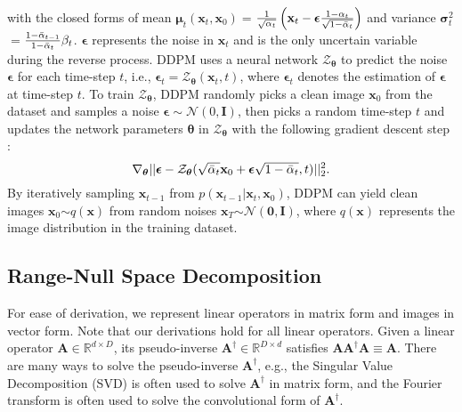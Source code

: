 \documentclass{article} \usepackage{iclr2023_conference,times}
\begin{document}
with the closed forms of mean $\boldsymbol{\mu}_{t}(\mathbf{x}_{t},\mathbf{x}_{0})$$=$$\frac{1}{\sqrt{\alpha_{t}}}	\left( \mathbf{x}_{t} - \boldsymbol{\epsilon}\frac{1-\alpha_{t}}{\sqrt{1-\Bar{\alpha}_{t}}} \right)$ and variance $\mathbf{\sigma}_{t}^{2}$$=$$\frac{1-\Bar{\alpha}_{t-1}}{1-\Bar{\alpha}_{t}}\beta_{t}$. $\boldsymbol{\epsilon}$ represents the noise in $\mathbf{x}_{t}$ and is the only uncertain variable during the reverse process. DDPM uses a neural network $\mathcal{Z}_{\boldsymbol{\theta}}$ to predict the noise $\boldsymbol{\epsilon}$ for each time-step $t$, i.e., $\boldsymbol{\epsilon}_t=\mathcal{Z}_{\boldsymbol{\theta}}(\mathbf{x}_{t},t)$, where $\boldsymbol{\epsilon}_t$ denotes the estimation of $\boldsymbol{\epsilon}$ at time-step $t$. To train  $\mathcal{Z}_{\boldsymbol{\theta}}$, DDPM randomly picks a clean image $\mathbf{x}_{0}$ from the dataset and samples a noise $\boldsymbol{\epsilon}\sim \mathcal{N}(0,\mathbf{I})$, then picks a random time-step $t$ and updates the network parameters $\boldsymbol{\theta}$ in $\mathcal{Z}_{\boldsymbol{\theta}}$ with the following gradient descent step \citep{ho2020denoising}:
\begin{equation}
    \nabla_{\boldsymbol{\theta}}||\boldsymbol{\epsilon}-\mathcal{Z}_{\boldsymbol{\theta}}(\sqrt{\Bar{\alpha}_{t}}\mathbf{x}_{0} + \boldsymbol{\epsilon}\sqrt{1-\Bar{\alpha}_{t}},t)||^{2}_{2}.
    \label{eq:7}
\end{equation}
By iteratively sampling $\mathbf{x}_{t-1}$ from $p(\mathbf{x}_{t-1}|\mathbf{x}_{t},\mathbf{x}_{0})$,  DDPM can yield clean images $\mathbf{x}_{0}$$\sim $$q(\mathbf{x})$ from random noises $\mathbf{x}_{T}$$\sim$$\mathcal{N}(\mathbf{0},\mathbf{I})$, where $q(\mathbf{x})$ represents the image distribution in the training dataset.


\subsection{Range-Null Space Decomposition}
\label{RND}
For ease of derivation, we represent linear operators in matrix form and images in vector form. Note that our derivations hold for all linear operators. Given a linear operator $\mathbf{A}\in\mathbb{R}^{d\times D}$, its pseudo-inverse $\mathbf{A^{\dagger}}\in\mathbb{R}^{D\times d}$ satisfies $\mathbf{A}\mathbf{A^{\dagger}\mathbf{A}}\equiv\mathbf{A}$. There are many ways to solve the pseudo-inverse $\mathbf{A}^{\dagger}$, e.g., the Singular Value Decomposition (SVD) is often used to solve $\mathbf{A}^{\dagger}$ in matrix form, and the Fourier transform is often used to solve the convolutional form of $\mathbf{A}^{\dagger}$. 
\end{document}
